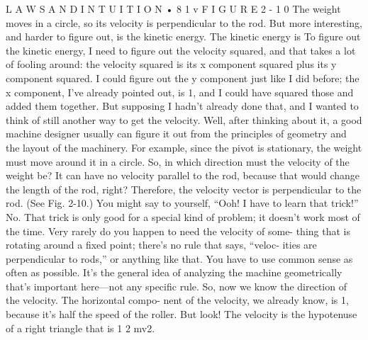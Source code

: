 \documentclass[10pt,oneside]{article}
\begin{document}
L A W S  A N D  I N T U I T I O N • 8 1 v F I G U R E  2 - 1 0 The weight moves in a circle, so its velocity is perpendicular to the rod. But more interesting, and harder to figure out, is the kinetic energy. The kinetic energy is To figure out the kinetic energy, I need to figure out the velocity squared, and that takes a lot of fooling around: the velocity squared is its x component squared plus its y component squared. I could figure out the y component just like I did before; the x component, I’ve already pointed out, is 1, and I could have squared those and added them together. But supposing I hadn’t already done that, and I wanted to think of still another way to get the velocity. Well, after thinking about it, a good machine designer usually can figure it out from the principles of geometry and the layout of the machinery. For example, since the pivot is stationary, the weight must move around it in a circle. So, in which direction must the velocity of the weight be? It can have no velocity parallel to the rod, because that would change the length of the rod, right? Therefore, the velocity vector is perpendicular to the rod. (See Fig. 2-10.) You might say to yourself, “Ooh! I have to learn that trick!” No. That trick is only good for a special kind of problem; it doesn’t work most of the time. Very rarely do you happen to need the velocity of some- thing that is rotating around a fixed point; there’s no rule that says, “veloc- ities are perpendicular to rods,” or anything like that. You have to use common sense as often as possible. It’s the general idea of analyzing the machine geometrically that’s important here---not any specific rule. So, now we know the direction of the velocity. The horizontal compo- nent of the velocity, we already know, is 1, because it’s half the speed of the roller. But look! The velocity is the hypotenuse of a right triangle that is 1 2 mv2.\par
\end{document}
